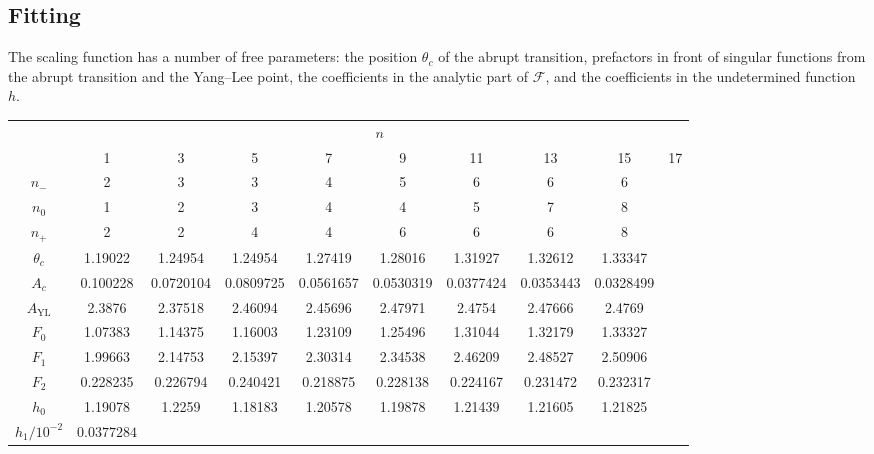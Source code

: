 \documentclass[
  aps,
  pre,
  preprint,
  longbibliography,
  floatfix
]{revtex4-2}
\begin{document}
\subsection{Fitting}

The scaling function has a number of free parameters: the position $\theta_c$ of the abrupt transition, prefactors in front of singular functions from the abrupt transition and the Yang--Lee point, the coefficients in the analytic part of $\mathcal F$, and the coefficients in the undetermined function $h$.

\begin{table}
  \begin{tabular}{c|ccccccccc}
     & \multicolumn{9}{c}{$n$} \\
     & 1 & 3 & 5 & 7 & 9 & 11 & 13 & 15 & 17 \\
    \hline\hline
    $n_-$ & 2 & 3 & 3 & 4 & 5 & 6 & 6 & 6 \\
    $n_0$ & 1 & 2 & 3 & 4 & 4 & 5 & 7 & 8 \\
    $n_+$ & 2 & 2 & 4 & 4 & 6 & 6 & 6 & 8
    \\ \hline
    $\theta_c$ &
      1.19022 &
      1.24954 &
      1.24954 &
      1.27419 &
      1.28016 &
      1.31927 & 
      1.32612 &
      1.33347 &
              \\
    $A_c$ &
      0.100228 &
      0.0720104 &
      0.0809725 &
      0.0561657 &
      0.0530319 &
      0.0377424 &
      0.0353443 &
      0.0328499 &
                \\
    $A_{\mathrm{YL}}$ &
      2.3876 &
      2.37518 &
      2.46094 &
      2.45696 &
      2.47971 &
      2.4754 &
      2.47666 &
      2.4769 &
                \\
    $F_0$ &
      1.07383 &
      1.14375 &
      1.16003 &
      1.23109 &
      1.25496 &
      1.31044 &
      1.32179 &
      1.33327 &
                \\
    $F_1$ &
      1.99663 &
      2.14753 &
      2.15397 &
      2.30314 &
      2.34538 &
      2.46209 &
      2.48527 &
      2.50906 &
                \\
    $F_2$ &
      0.228235 &
      0.226794 &
      0.240421 &
      0.218875 &
      0.228138 &
      0.224167 &
      0.231472 &
      0.232317 &
                \\
    $h_0$ &
      1.19078 &
      1.2259 &
      1.18183 &
      1.20578 &
      1.19878 &
      1.21439 &
      1.21605 &
      1.21825 &
                \\
      $h_1/10^{-2}$ &
      $0.0377284$ &

\end{tabular}
\end{table}
\end{document}
